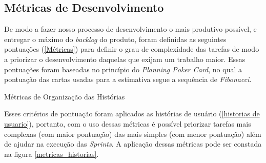 \subsection{Métricas de Desenvolvimento}
De modo a fazer nosso processo de desenvolvimento o mais produtivo possível, e entregar o máximo do \textit{backlog} do produto, foram definidas as seguintes pontuações (\autoref{Métricas}) para definir o grau de complexidade das tarefas de modo a priorizar o desenvolvimento daquelas que exijam um trabalho maior. Essas pontuações foram baseadas no princípio do \textit{Planning Poker Card}, no qual a pontuação das cartas usadas para a estimativa segue a sequência de \textit{Fibonacci}. 

\def\arraystretch{2}
\begin{quadro}[htb]
\centering
\ABNTEXfontereduzida
\caption{Métricas de Organização das Histórias}
\label{Métricas}
\end{quadro}
\FloatBarrier

Esses critérios de pontuação foram aplicados as histórias de usuário (\autoref{historias de usuario}), portanto, com o uso dessas métricas é possível priorizar tarefas mais complexas (com maior pontuação) das mais simples (com menor pontuação) além de ajudar na execução das \textsl{Sprints}. A aplicação dessas métricas pode ser constada na figura \autoref{metricas_historias}.

